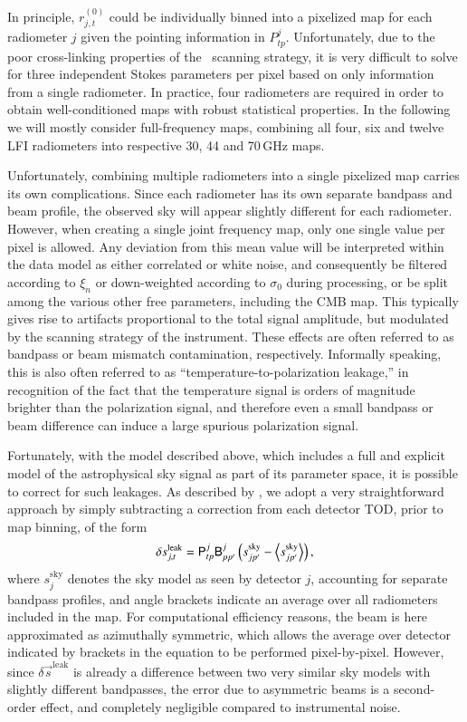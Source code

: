 \documentclass[twocolumn]{aa}
\newcommand{\s}[0]{\vec{s}}
\newcommand{\B}[0]{\tens{B}}
\renewcommand{\P}[0]{\tens{P}}
\begin{document}
In principle, $r^{(0)}_{j,t}$ could be individually binned into a
pixelized map for each radiometer $j$ given the pointing information
in $P^{j}_{tp}$. Unfortunately, due to the poor cross-linking
properties of the \Planck\ scanning strategy, it is very difficult to
solve for three independent Stokes parameters per pixel based on only
information from a single radiometer. In practice, four radiometers
are required in order to obtain well-conditioned maps with robust
statistical properties. In the following we will mostly consider
full-frequency maps, combining all four, six and twelve LFI
radiometers into respective 30, 44 and 70\,GHz maps.

Unfortunately, combining multiple radiometers into a single pixelized
map carries its own complications. Since each radiometer has its own
separate bandpass and beam profile, the observed sky will appear
slightly different for each radiometer. However, when creating a
single joint frequency map, only one single value per pixel is
allowed. Any deviation from this mean value will be interpreted within
the data model as either correlated or white noise, and consequently
be filtered according to $\xi_n$ or down-weighted according to
$\sigma_0$ during processing, or be split among the various other free
parameters, including the CMB map. This typically gives rise to
artifacts proportional to the total signal amplitude, but modulated by
the scanning strategy of the instrument. These effects are often
referred to as bandpass or beam mismatch contamination,
respectively. Informally speaking, this is also often referred to as
``temperature-to-polarization leakage,'' in recognition of the fact
that the temperature signal is orders of magnitude brighter than the
polarization signal, and therefore even a small bandpass or beam
difference can induce a large spurious polarization signal.

Fortunately, with the model described above, which includes a full and
explicit model of the astrophysical sky signal as part of its
parameter space, it is possible to correct for such leakages. As
described by \citet{bp09}, we adopt a very straightforward approach by
simply subtracting a correction from each detector TOD, prior to map
binning, of the form
\begin{equation}
\delta s^{\mathrm{leak}}_{j, t} = \P^{j}_{tp}\B_{pp'}^j\left(s^{\mathrm{sky}}_{jp'} - \left<s^{\mathrm{sky}}_{jp'}\right>\right),
\label{eq:leak}
\end{equation}
where $s^{\mathrm{sky}}_{j}$ denotes the sky model as seen by detector
$j$, accounting for separate bandpass profiles, and angle brackets
indicate an average over all radiometers included in the map. For
computational efficiency reasons, the beam is here approximated as
azimuthally symmetric, which allows the average over detector
indicated by brackets in the equation to be performed
pixel-by-pixel. However, since $\delta \s^{\mathrm{leak}}$ is already a
difference between two very similar sky models with slightly different
bandpasses, the error due to asymmetric beams is a second-order
effect, and completely negligible compared to instrumental noise.
\end{document}
